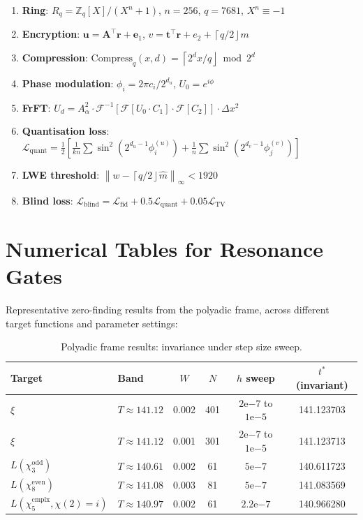 \documentclass[11pt, a4paper]{article}
\theoremstyle{definition}
\theoremstyle{plain}
\newcommand{\Rq}{\mathbb{Z}_q[X]/(X^n+1)}
\newcommand{\norm}[1]{\left\|#1\right\|}
\newcommand{\ceil}[1]{\left\lceil#1\right\rfloor}
\newcommand{\xif}{\xi}                      %
\begin{document}
\begin{enumerate}
  \item \textbf{Ring}: $R_q = \Rq$, $n=256$, $q=7681$, $X^n \equiv -1$
  \item \textbf{Encryption}: $\mathbf{u} = \mathbf{A}^\top\mathbf{r}+\mathbf{e}_1$,
        $v = \mathbf{t}^\top\mathbf{r}+e_2+\ceil{q/2}m$
  \item \textbf{Compression}: $\mathrm{Compress}_q(x,d) = \ceil{2^d x/q} \bmod 2^d$
  \item \textbf{Phase modulation}: $\phi_i = 2\pi c_i/2^{d_u}$,
        $U_0 = e^{i\phi}$
  \item \textbf{FrFT}: $U_d = A_\alpha^2 \cdot \mathcal{F}^{-1}[\mathcal{F}[U_0 \cdot C_1] \cdot \mathcal{F}[C_2]] \cdot \Delta x^2$
  \item \textbf{Quantisation loss}: $\mathcal{L}_{\mathrm{quant}} = \frac{1}{2}[\frac{1}{kn}\sum\sin^2(2^{d_u-1}\phi_i^{(u)}) + \frac{1}{n}\sum\sin^2(2^{d_v-1}\phi_j^{(v)})]$
  \item \textbf{LWE threshold}: $\norm{w - \ceil{q/2}\hat{m}}_\infty < 1920$
  \item \textbf{Blind loss}: $\mathcal{L}_{\mathrm{blind}} = \mathcal{L}_{\mathrm{fid}} + 0.5\mathcal{L}_{\mathrm{quant}} + 0.05\mathcal{L}_{\mathrm{TV}}$
\end{enumerate}


\section{Numerical Tables for Resonance Gates}
\label{app:numerical}

Representative zero-finding results from the polyadic frame, across
different target functions and parameter settings:

\begin{table}[ht]
\centering
\caption{Polyadic frame results: invariance under step size sweep.}
\label{tab:polyadic_sweep}
\small
\begin{tabular}{@{} llcccc @{}}
\toprule
\textbf{Target} & \textbf{Band} & $W$ & $N$ & $h$ sweep
& $t^*$ (invariant) \\
\midrule
$\xif$ & $T\approx141.12$ & 0.002 & 401 &
$2\mathrm{e}{-7}$ to $1\mathrm{e}{-5}$ & 141.123703 \\
$\xif$ & $T\approx141.12$ & 0.001 & 301 &
$2\mathrm{e}{-7}$ to $1\mathrm{e}{-5}$ & 141.123713 \\
$L(\chi_3^{\mathrm{odd}})$ & $T\approx140.61$ & 0.002 & 61 &
$5\mathrm{e}{-7}$ & 140.611723 \\
$L(\chi_8^{\mathrm{even}})$ & $T\approx141.08$ & 0.003 & 81 &
$5\mathrm{e}{-7}$ & 141.083569 \\
$L(\chi_5^{\mathrm{cmplx}}, \chi(2)=i)$ & $T\approx140.97$ & 0.002 & 61 &
$2.2\mathrm{e}{-7}$ & 140.966280 \\
\bottomrule
\end{tabular}
\end{table}
\end{document}
